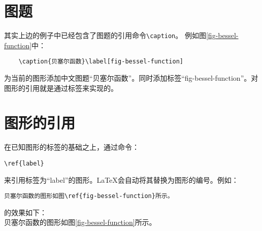 \section{图题}
其实上边的例子中已经包含了图题的引用命令\verb|\caption|。
例如图\ref{fig-bessel-function}中：
\begin{verbatim}
    \caption{贝塞尔函数}\label[fig-bessel-function]
\end{verbatim}
为当前的图形添加中文图题“贝塞尔函数”。同时添加标签“fig-bessel-function”。对图形的引用就是通过标签来实现的。

\section{图形的引用}
在已知图形的标签的基础之上，通过命令：
\begin{verbatim}
\ref{label}
\end{verbatim}
来引用标签为“label”的图形。\LaTeX 会自动将其替换为图形的编号。例如：
\begin{verbatim}
贝塞尔函数的图形如图\ref{fig-bessel-function}所示。
\end{verbatim}
的效果如下：\\
贝塞尔函数的图形如图\ref{fig-bessel-function}所示。
